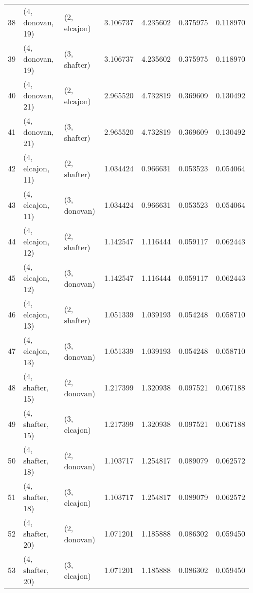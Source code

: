 \begin{tabular}{lllrrrr}
38 &  (4, donovan, 19) &     (2, elcajon) &  3.106737 &  4.235602 &   0.375975 &  0.118970 \\
39 &  (4, donovan, 19) &     (3, shafter) &  3.106737 &  4.235602 &   0.375975 &  0.118970 \\
40 &  (4, donovan, 21) &     (2, elcajon) &  2.965520 &  4.732819 &   0.369609 &  0.130492 \\
41 &  (4, donovan, 21) &     (3, shafter) &  2.965520 &  4.732819 &   0.369609 &  0.130492 \\
42 &  (4, elcajon, 11) &     (2, shafter) &  1.034424 &  0.966631 &   0.053523 &  0.054064 \\
43 &  (4, elcajon, 11) &     (3, donovan) &  1.034424 &  0.966631 &   0.053523 &  0.054064 \\
44 &  (4, elcajon, 12) &     (2, shafter) &  1.142547 &  1.116444 &   0.059117 &  0.062443 \\
45 &  (4, elcajon, 12) &     (3, donovan) &  1.142547 &  1.116444 &   0.059117 &  0.062443 \\
46 &  (4, elcajon, 13) &     (2, shafter) &  1.051339 &  1.039193 &   0.054248 &  0.058710 \\
47 &  (4, elcajon, 13) &     (3, donovan) &  1.051339 &  1.039193 &   0.054248 &  0.058710 \\
48 &  (4, shafter, 15) &     (2, donovan) &  1.217399 &  1.320938 &   0.097521 &  0.067188 \\
49 &  (4, shafter, 15) &     (3, elcajon) &  1.217399 &  1.320938 &   0.097521 &  0.067188 \\
50 &  (4, shafter, 18) &     (2, donovan) &  1.103717 &  1.254817 &   0.089079 &  0.062572 \\
51 &  (4, shafter, 18) &     (3, elcajon) &  1.103717 &  1.254817 &   0.089079 &  0.062572 \\
52 &  (4, shafter, 20) &     (2, donovan) &  1.071201 &  1.185888 &   0.086302 &  0.059450 \\
53 &  (4, shafter, 20) &     (3, elcajon) &  1.071201 &  1.185888 &   0.086302 &  0.059450 \\
\bottomrule
\end{tabular}
